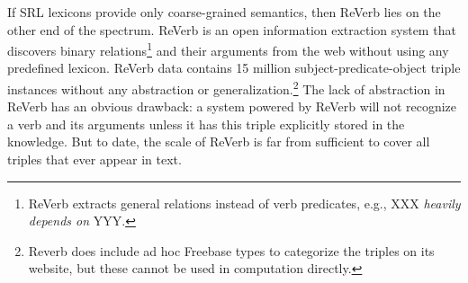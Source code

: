 
If SRL lexicons provide only coarse-grained semantics, then
ReVerb \cite{FaderSE11} lies on the other end of the spectrum.
ReVerb is an open information extraction system that discovers
binary relations\footnote{ReVerb extracts general relations
instead of verb predicates,
e.g., XXX {\em heavily depends on} YYY.}
and their arguments from the web without using any predefined
lexicon.
ReVerb data contains 15 million subject-predicate-object triple
instances without any abstraction or generalization.\footnote{Reverb
does include ad hoc Freebase \cite{freebase}
types to categorize the triples on its website, but these
cannot be used in computation directly.}
The lack of abstraction in ReVerb has
an obvious drawback: a system powered by ReVerb will not recognize a
verb and its arguments unless it has this triple explicitly stored
in the knowledge. But to date, the scale of ReVerb is far from sufficient
to cover all triples that ever appear in text.

